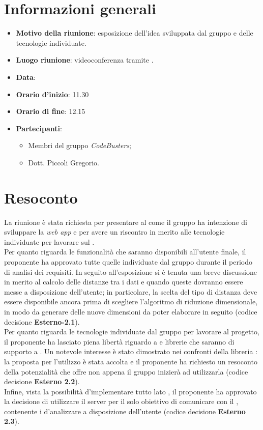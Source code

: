 \section{Informazioni generali}
\begin{itemize}
\item \textbf{Motivo della riunione}: esposizione dell'idea sviluppata dal gruppo e delle tecnologie individuate.
\item \textbf{Luogo riunione}: videoconferenza tramite .
\item \textbf{Data}: \Data{}
\item \textbf{Orario d'inizio}: 11.30 
\item \textbf{Orario di fine}: 12.15 
\item \textbf{Partecipanti}:
	\begin{itemize}
	\item Membri del gruppo \textit{CodeBusters};
	\item Dott. Piccoli Gregorio.
	\end{itemize}
\end{itemize}

\section{Resoconto}
La riunione è stata richiesta per presentare al  come il gruppo ha intenzione di sviluppare la \textit{web app}\glo{} e per avere un riscontro in merito alle tecnologie individuate per lavorare sul . \\
Per quanto riguarda le funzionalità che saranno disponibili all'utente finale, il proponente ha approvato tutte quelle individuate dal gruppo durante il periodo di analisi dei requisiti. In seguito all'esposizione si è tenuta una breve discussione in merito al calcolo delle distanze tra i dati e quando queste dovranno essere messe a disposizione dell'utente; in particolare, la scelta del tipo di distanza deve essere disponibile ancora prima di scegliere l'algoritmo di riduzione dimensionale, in modo da generare delle nuove dimensioni da poter elaborare in seguito (codice decisione \textbf{Esterno-2.1}). \\
Per quanto riguarda le tecnologie individuate dal gruppo per lavorare al progetto, il proponente ha lasciato piena libertà riguardo a  e librerie che saranno di supporto a . Un notevole interesse è stato dimostrato nei confronti della libreria : la proposta per l'utilizzo è stata accolta e il proponente ha richiesto un resoconto della potenzialità che offre non appena il gruppo inizierà ad utilizzarla (codice decisione \textbf{Esterno 2.2}). \\
Infine, vista la possibilità d'implementare tutto lato , il proponente ha approvato la decisione di utilizzare il server per il solo obiettivo di comunicare con il , contenente i  d'analizzare a disposizione dell'utente (codice decisione \textbf{Esterno 2.3}).
